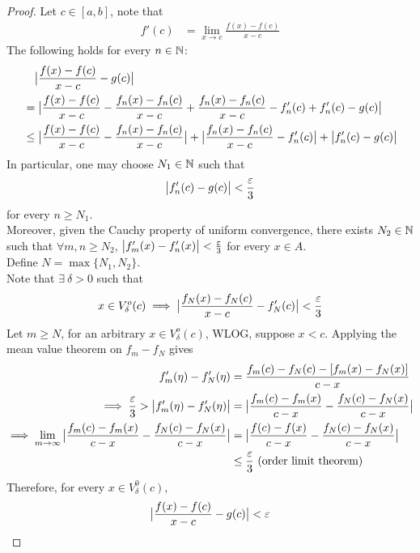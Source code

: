 \documentclass[11pt]{article}
\begin{document}
	\begin{proof}
		Let $c \in [a, b]$, note that 
		\begin{align}
			f'(c) &= \lim_{x \to c} \frac{f(x) - f(c)}{x - c}
		\end{align}
		The following holds for every $n \in \mathbb{N}$:
		\begin{align}
			&\quad\big \vert {\frac{f(x) - f(c)}{x - c} - g(c)} \big \vert \\
			&=\big \vert {\frac{f(x) - f(c)}{x - c} - \frac{f_n(x) - f_n(c)}{x - c} + \frac{f_n(x) - f_n(c)}{x - c} - f'_n(c) + f'_n(c) - g(c)} \big \vert \\
			&\leq \big \vert {\frac{f(x) - f(c)}{x - c} - \frac{f_n(x) - f_n(c)}{x - c}} \big \vert + \big \vert {\frac{f_n(x) - f_n(c)}{x - c} - f'_n(c)} \big \vert + \big \vert {f_n'(c) - g(c)} \big \vert
		\end{align}
		In particular, one may choose $N_1 \in \mathbb{N}$ such that 
		\begin{align}
			\big \vert {f'_n(c) - g(c)} \big \vert < \frac{\varepsilon}{3}	
		\end{align}
		for every $n \geq N_1$. \\
		Moreover, given the Cauchy property of uniform convergence, there exists $N_2 \in \mathbb{N}$ such that $\forall m, n \geq N_2$, $\big \vert {f'_m(x) - f'_n(x)} \big \vert < \frac{\varepsilon}{3}$ for every $x \in A$. \\
		Define $N = \max\{N_1, N_2\}$.\\
		Note that $\exists\ \delta > 0$ such that 
		\begin{align}
			x \in V^o_\delta(c) \implies \big \vert {\frac{f_N(x) - f_N(c)}{x - c} - f'_N(c)} \big \vert < \frac{\varepsilon}{3}
		\end{align}
		Let $m \geq N$, for an arbitrary $x \in V^o_\delta(c)$, WLOG, suppose $x < c$. Applying the mean value theorem on $f_m - f_N$ gives
		\begin{align}
			f'_m(\eta) - f'_N(\eta) &= \frac{f_m(c) - f_N(c) - [f_m(x) - f_N(x)]}{c-x} \\
			\implies \frac{\varepsilon}{3} > \big \vert {f'_m(\eta) - f'_N(\eta)} \big \vert &= \big \vert {
			\frac{f_m(c) - f_m(x)}{c-x} - \frac{f_N(c) - f_N(x)}{c-x}
			} \big \vert \\
			\implies \lim_{m \to \infty} \big \vert {
			\frac{f_m(c) - f_m(x)}{c-x} - \frac{f_N(c) - f_N(x)}{c-x}
			} \big \vert &= \big \vert {
			\frac{f(c) - f(x)}{c-x} - \frac{f_N(c) - f_N(x)}{c-x}
			} \big \vert \\
			&\leq \frac{\varepsilon}{3} \text{{ (order limit theorem)}}
		\end{align}
		Therefore, for every $x \in V_\delta^0(c)$, 
		\begin{align}
			\big \vert {\frac{f(x) - f(c)}{x - c} - g(c)} \big \vert < \varepsilon
		\end{align}
	\end{proof}
	
\end{document}
